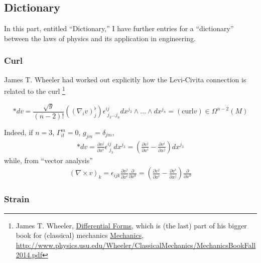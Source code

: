 \documentclass[twoside,landscape,10pt]{amsart}
\theoremstyle{plain}
\theoremstyle{definition}
\theoremstyle{remark}
\begin{document}
\begin{multicols*}{2}
\part{Dictionary}

In this part, entitled ``Dictionary,'' I have further entries for a ``dictionary'' between the laws of physics and its application in engineering.  

\section{Curl}

James T. Wheeler had worked out explicitly how the Levi-Civita connection is related to the curl \footnote{James T. Wheeler, \href{http://www.physics.usu.edu/Wheeler/ClassicalMechanics/CMDifferentialForms.pdf}{Differential Forms}, which is (the last) part of his bigger book for (classical) mechanics \href{http://www.physics.usu.edu/Wheeler/ClassicalMechanics/MechanicsBookFall2014.pdf}{Mechanics}, \url{http://www.physics.usu.edu/Wheeler/ClassicalMechanics/MechanicsBookFall2014.pdf}}

\begin{equation}
  *dv = \frac{ \sqrt{g}}{ (n-2)!} ((\nabla_i v)^{\flat}_j ) \epsilon^{ij}_{ \,\, j_3 \dots j_n} dx^{j_3} \wedge \dots \wedge dx^{j_n} = (\text{curl}v) \in \Omega^{n-2}(M)
\end{equation}

Indeed, if $n=3$, $\Gamma^m_{il} = 0$, $g_{jm} = \delta_{jm}$, 
\[
\begin{gathered}
  * dv = \frac{ \partial v^j}{ \partial x^i } \epsilon^{ij}_{ \,\, j_3} dx^{j_3} = \left( \frac{ \partial v^j}{ \partial x^i} - \frac{ \partial v^i}{ \partial x^j} \right) dx^{j_3} 
\end{gathered}
\]
while, from ``vector analysis''
\[
\begin{gathered}
  (\nabla \times v)_k = \epsilon_{ijk} \frac{ \partial v^j}{ \partial x^i} \frac{ \partial }{ \partial x^k} = \left( \frac{ \partial v^j}{ \partial x^i} - \frac{ \partial v^i}{ \partial x^j} \right) \frac{ \partial }{ \partial x^k}
\end{gathered}
\]

\section{Strain}


\end{multicols*}
\end{document}
